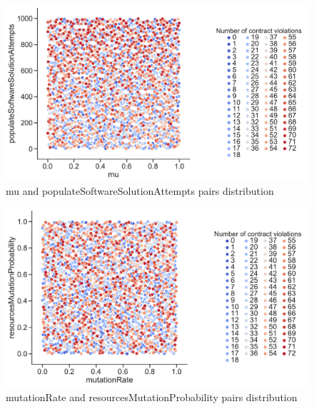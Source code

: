 \begin{figure}
	\centering
	\includegraphics[width=\textwidth]{images/PairsDistr/mu_populateSoftwareSolutionAttempts.pdf}
	\caption[mu and populateSoftwareSolutionAttempts pairs distribution]{mu and populateSoftwareSolutionAttempts pairs distribution}
	\label{fig:mu_populateSoftwareSolutionAttempts_pair}
\end{figure}
\begin{figure}
	\centering
	\includegraphics[width=\textwidth]{images/PairsDistr/mutationRate_resourcesMutationProbability.pdf}
	\caption[mutationRate and resourcesMutationProbability pairs distribution]{mutationRate and resourcesMutationProbability pairs distribution}
	\label{fig:mutationRate_resourcesMutationProbability_pair}
\end{figure}
